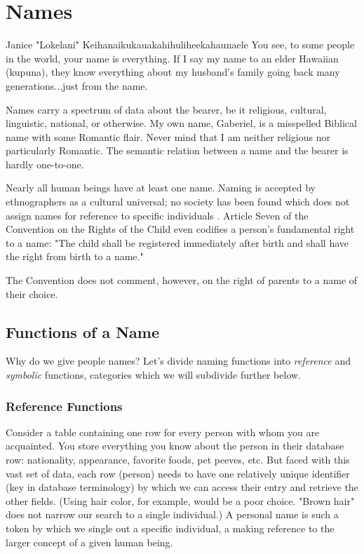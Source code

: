 \section{Names}

\begin{aquote}{Janice "Lokelani" Keihanaikukauakahihuliheekahaunaele}
You see, to some people in the world, your name is everything. If I say my name
to an elder Hawaiian (kupuna), they know everything about my husband's family
going back many generations...just from the name. \parencite{lee-valley}
\end{aquote}

Names carry a spectrum of data about the bearer, be it religious, cultural,
linguistic, national, or otherwise. My own name, Gaberiel, is a misspelled
Biblical name with some Romantic flair. Never mind that I am neither religious
nor particularly Romantic. The semantic relation between a name and the bearer
is hardly one-to-one.

Nearly all human beings have at least one name. Naming is accepted by
ethnographers as a cultural universal; no society has been found which does not
assign names for reference to specific individuals \parencite{alford88}. Article
Seven of the Convention on the Rights of the Child even codifies a person's
fundamental right to a name: "The child shall be registered immediately after
birth and shall have the right from birth to a name." \parencite{crc}

The Convention does not comment, however, on the right of parents to a name of
their choice.

\subsection{Functions of a Name}

Why do we give people names? Let's divide naming functions into
\textit{reference} and \textit{symbolic} functions, categories which we will
subdivide further below.

\subsubsection{Reference Functions}

Consider a table containing one row for every person with whom you are
acquainted. You store everything you know about the person in their database
row: nationality, appearance, favorite foods, pet peeves, etc. But faced with
this vast set of data, each row (person) needs to have one relatively unique
identifier (key in database terminology) by which we can access their entry and
retrieve the other fields. (Using hair color, for example, would be a poor
choice. "Brown hair" does not narrow our search to a single individual.) A
personal name is such a token by which we single out a specific individual, a
making reference to the larger concept of a given human being.

